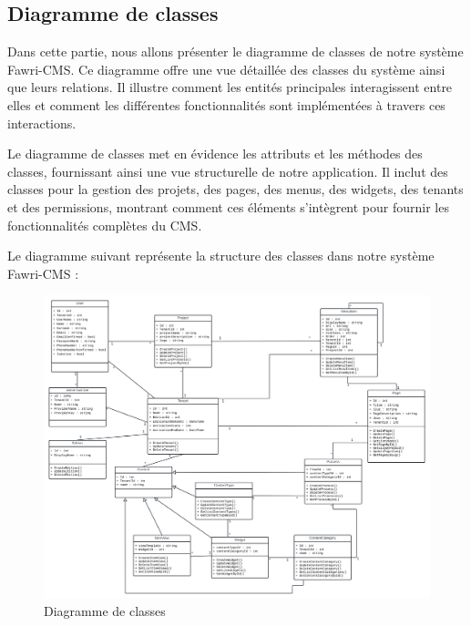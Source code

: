 \subsection{Diagramme de classes}
\hspace{\parindent}Dans cette partie, nous allons présenter le diagramme de classes de notre système Fawri-CMS. Ce diagramme offre une vue détaillée des classes du système ainsi que leurs relations. Il illustre comment les entités principales interagissent entre elles et comment les différentes fonctionnalités sont implémentées à travers ces interactions.

Le diagramme de classes met en évidence les attributs et les méthodes des classes, fournissant ainsi une vue structurelle de notre application. Il inclut des classes pour la gestion des projets, des pages, des menus, des widgets, des tenants et des permissions, montrant comment ces éléments s'intègrent pour fournir les fonctionnalités complètes du CMS.

Le diagramme suivant représente la structure des classes dans notre système Fawri-CMS :



\begin{figure}[H]
  \centering
  \includegraphics[width=20cm]{Figures/diag de classe.png}
  \caption{Diagramme de classes}
\end{figure}




